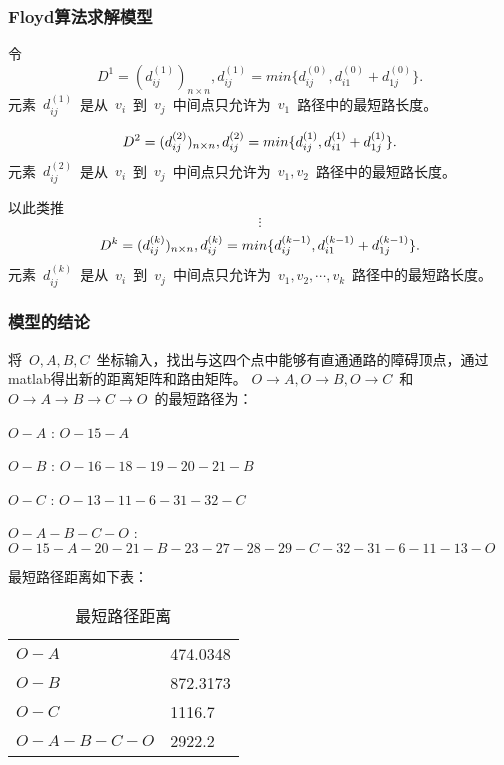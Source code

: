 \documentclass{JXUSTmodeling}
\begin{document}
\subsubsection{Floyd算法求解模型}\label{sec:5.2.4}
令
\begin{equation}
  D^1 = (d_{ij}^{(1)})_{n\times n},
  d_{ij}^{(1)}=min\{d_{ij}^{(0)},d_{i1}^{(0)}+d_{1j}^{(0)}\}.
\end{equation}
元素~$d_{ij}^{(1)}$~是从~$v_i$~到~$v_j$~中间点只允许为~$v_1$~路径中的最短路长度。

\begin{equation}
  D^2 = (d_{ij}^{(2)})_{n\times n},\\
  d_{ij}^{(2)}=min\{d_{ij}^{(1)},d_{i1}^{(1)}+d_{1j}^{(1)}\}.
\end{equation}
元素~$d_{ij}^{(2)}$~是从~$v_i$~到~$v_j$~中间点只允许为~$v_1,v_2$~路径中的最短路长度。\par
以此类推
$$
\vdots
$$
\begin{equation}
  D^k = (d_{ij}^{(k)})_{n\times n},\\
  d_{ij}^{(k)}=min\{d_{ij}^{(k-1)},d_{i1}^{(k-1)}+d_{1j}^{(k-1)}\}.
\end{equation}
元素~$d_{ij}^{(k)}$~是从~$v_i$~到~$v_j$~中间点只允许为~$v_1,v_2,\cdots,v_k$~路径中的最短路长度。

\subsubsection{模型的结论}\label{sec:5.2.5}
将~$O,A,B,C$~坐标输入，找出与这四个点中能够有直通通路的障碍顶点，通过matlab得出新的距离矩阵和路由矩阵。
$O\to A,O\to B,O\to C$~和~$O\to A\to B\to C\to O$~的最短路径为：\par
$O-A$ : $O-15-A$\par
$O-B$ : $O-16-18-19-20-21-B$\par
$O-C$ : $O-13-11-6-31-32-C$\par
$O-A-B-C-O$ : $O-15-A-20-21-B-23-27-28-29-C-32-31-6-11-13-O$\par


最短路径距离如下表：

\begin{table}[htbp]
  \centering
  \caption{最短路径距离}\label{tab:1}
    \begin{tabularx}{\textwidth}{YY}
    \toprule
    $O-A$ & 474.0348\\
    $O-B$ & 872.3173\\
    $O-C$ & 1116.7\\
    $O-A-B-C-O$ & 2922.2\\
    \bottomrule
  \end{tabularx}
\end{table}
\end{document}
